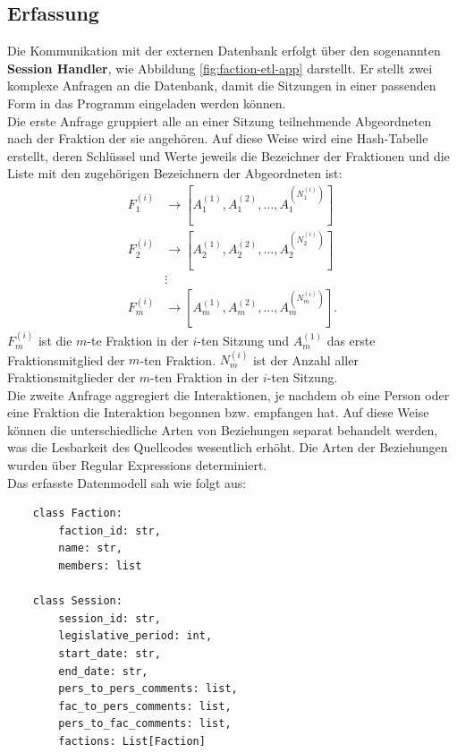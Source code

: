 \subsection{Erfassung}
Die Kommunikation mit der externen Datenbank erfolgt über den sogenannten \textbf{Session Handler}, wie Abbildung \ref{fig:faction-etl-app} darstellt.
Er stellt zwei komplexe Anfragen an die Datenbank, damit die Sitzungen in einer passenden Form in das Programm eingeladen werden können.\\  
Die erste Anfrage gruppiert alle an einer Sitzung teilnehmende Abgeordneten nach der Fraktion der sie angehören.
Auf diese Weise wird eine Hash-Tabelle erstellt, deren Schlüssel und Werte jeweils die Bezeichner der Fraktionen und die Liste mit den zugehörigen Bezeichnern der Abgeordneten ist:
\begin{equation}
    \begin{aligned}
        \label{math:faction-hash-table}
        F_{1}^{(i)} &\rightarrow [A_{1}^{(1)}, A_{1}^{(2)}, \dots ,A_{1}^{(N_{1}^{(i)})}]\\
        F_{2}^{(i)} &\rightarrow [A_{2}^{(1)}, A_{2}^{(2)}, \dots ,A_{2}^{(N_{2}^{(i)})}]\\
            &\vdots\\
        F_{m}^{(i)} &\rightarrow [A_{m}^{(1)}, A_{m}^{(2)}, \dots ,A_{m}^{(N_{m}^{(i)})}].
    \end{aligned}
\end{equation}
$F_{m}^{(i)}$ ist die $m$-te Fraktion in der $i$-ten Sitzung und $A_{m}^{(1)}$ das erste Fraktionsmitglied der $m$-ten Fraktion.
$N_{m}^{(i)}$ ist der Anzahl aller Fraktionsmitglieder der $m$-ten Fraktion in der $i$-ten Sitzung.\\
Die zweite Anfrage aggregiert die Interaktionen, je nachdem ob eine Person oder eine Fraktion die Interaktion begonnen bzw. empfangen hat. 
Auf diese Weise können die unterschiedliche Arten von Beziehungen separat behandelt werden, was die Lesbarkeit des Quellcodes wesentlich erhöht.
Die Arten der Beziehungen wurden über Regular Expressions determiniert.\\
Das erfasste Datenmodell sah wie folgt aus: 
\begin{verbatim}
    class Faction:
        faction_id: str,
        name: str,
        members: list
        
    class Session:
        session_id: str, 
        legislative_period: int, 
        start_date: str,
        end_date: str, 
        pers_to_pers_comments: list, 
        fac_to_pers_comments: list, 
        pers_to_fac_comments: list,
        factions: List[Faction]
\end{verbatim}
